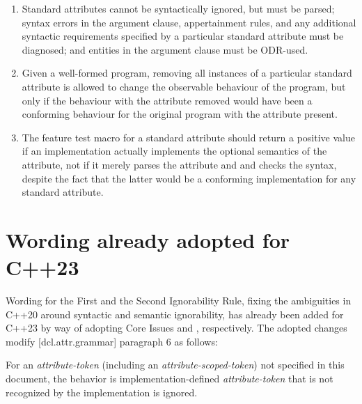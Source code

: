 \begin{enumerate}
\item Standard attributes cannot be syntactically ignored, but must be parsed; syntax errors in the argument clause, appertainment rules, and any additional syntactic requirements specified by a particular standard attribute must be diagnosed; and entities in the argument clause must be ODR-used.
\item Given a well-formed program, removing all instances of a particular standard attribute is allowed to change the observable behaviour of the program, but only if the behaviour with the attribute removed would have been a conforming behaviour for the original program with the attribute present.
\item The feature test macro for a standard attribute should return a positive value if an implementation actually implements the optional semantics of the attribute, not if it merely parses the attribute and and checks the syntax, despite the fact that the latter would be a conforming implementation for any standard attribute.
\end{enumerate}

\section{Wording already adopted for C++23}

Wording for the First and the Second Ignorability Rule, fixing the ambiguities in C++20 around syntactic and semantic ignorability, has already been added for C++23 by way of adopting Core Issues \cite{CWG2538} and \cite{CWG2695}, respectively. The adopted changes modify [dcl.attr.grammar] paragraph 6 as follows:

\begin{adjustwidth}{0.5cm}{0.5cm}
For an \emph{attribute-token} (including an \emph{attribute-scoped-token})  not specified in this document, the behavior is implementation-defined \emph{attribute-token} that is not recognized by the implementation is ignored.


\end{adjustwidth}

